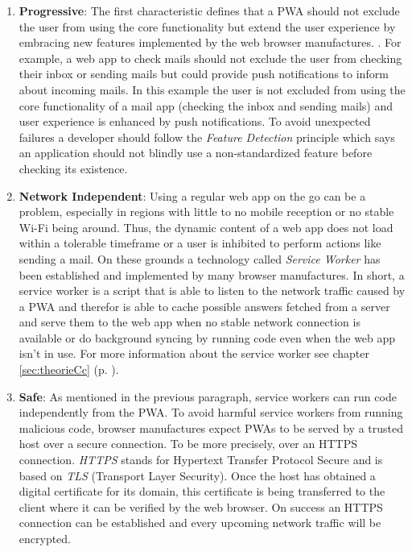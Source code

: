 \begin{enumerate} 
	\item  \textbf{Progressive}: The first characteristic defines that a PWA should not exclude the user from using the core functionality but extend the user experience by embracing new features implemented by the web browser manufactures. \cite[p. 100]{liebelProgressiveWebApps2019}\cite[p. 2]{hajianProgressiveWebApps2019}. For example, a web app to check mails should not exclude the user from checking their inbox or sending mails but could provide push notifications to inform about incoming mails. In this example the user is not excluded from using the core functionality of a mail app (checking the inbox and sending mails) and user experience is enhanced by push notifications. To avoid unexpected failures a developer should follow the \textit{Feature Detection} principle which says an application should not blindly use a non-standardized feature before checking its existence. \cite[p. 101]{liebelProgressiveWebApps2019}

	\item \textbf{Network Independent}: Using a regular web app on the go can be a problem, especially in regions with little to no mobile reception or no stable Wi-Fi being around. Thus, the dynamic content of a web app does not load within a tolerable timeframe or a user is inhibited to perform actions like sending a mail. \cite[p. 106]{liebelProgressiveWebApps2019} On these grounds a technology called \textit{Service Worker} has been established and implemented by many browser manufactures. In short, a service worker is a script that is able to listen to the network traffic caused by a PWA and therefor is able to cache possible answers fetched from a server and serve them to the web app when no stable network connection is available or do background syncing by running code even when the web app isn’t in use. For more information about the service worker see chapter \ref{sec:theorieCc} (p. \pageref{sec:theorieCc}). \cite[p. 43]{sheppardBeginningProgressiveWeb2017}

	\item \textbf{Safe}: As mentioned in the previous paragraph, service workers can run code independently from the PWA. To avoid harmful service workers from running malicious code, browser manufactures expect PWAs to be served by a trusted host over a secure connection. To be more precisely, over an HTTPS connection. \cite[p. 24]{sheppardBeginningProgressiveWeb2017} \textit{HTTPS} stands for Hypertext Transfer Protocol Secure and is based on \textit{TLS} (Transport Layer Security). Once the host has obtained a digital certificate for its domain, this certificate is being transferred to the client where it can be verified by the web browser. On success an HTTPS connection can be established and every upcoming network traffic will be encrypted. \cite[pp. 112-113]{liebelProgressiveWebApps2019}


\end{enumerate}
